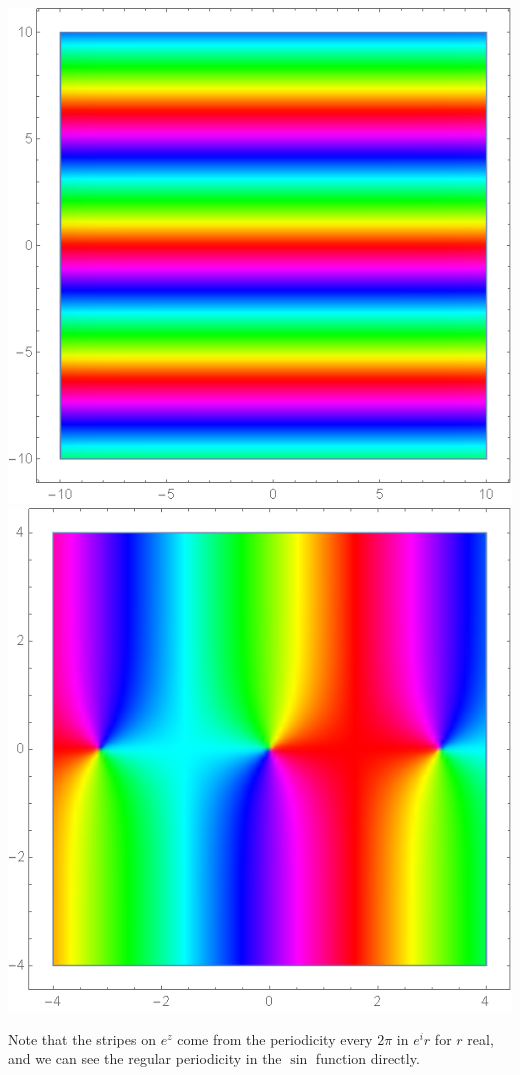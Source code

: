 \documentclass[12pt]{scrartcl}
\begin{document}
\begin{center}
	\includegraphics[scale=0.27]{images/colorez.png}
	\includegraphics[scale=0.27]{images/colorsinz.png}
\end{center}
Note that the stripes on $e^z$ come from the periodicity every $2\pi$ in $e^ir$ for $r$ real, and we can see the regular periodicity in the $\sin$ function directly.
\end{document}
